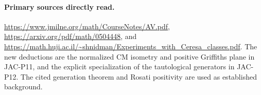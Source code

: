 \paragraph{Primary sources directly read.}
\url{https://www.jmilne.org/math/CourseNotes/AV.pdf},
\url{https://arxiv.org/pdf/math/0504448}, and
\url{https://math.huji.ac.il/~shnidman/Experiments_with_Ceresa_classes.pdf}.
The new deductions are the normalized CM isometry and positive
Griffiths plane in JAC-P11, and the explicit specialization of
the tautological generators in JAC-P12. The cited generation
theorem and Rosati positivity are used as established background.

